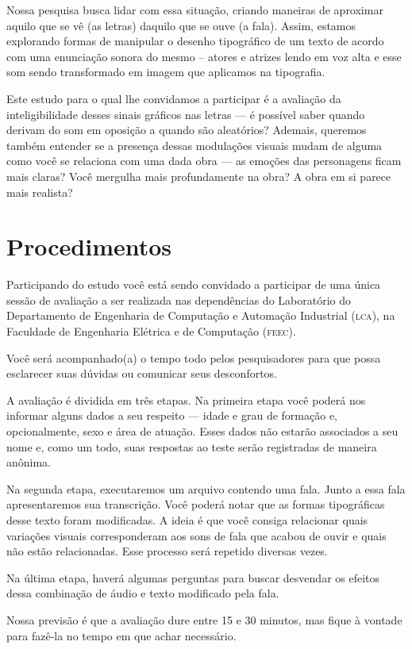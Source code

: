 \documentclass[a4paper,11pt,titlepage,singlespacing]{article}
\begin{document}
Nossa pesquisa busca lidar com essa situação, criando maneiras de aproximar aquilo que se vê (as letras) daquilo que se ouve (a fala). Assim, estamos explorando formas de manipular o desenho tipográfico de um texto de acordo com uma enunciação sonora do mesmo – atores e atrizes lendo em voz alta e esse som sendo transformado em imagem que aplicamos na tipografia.

Este estudo para o qual lhe convidamos a participar é a avaliação da inteligibilidade desses sinais gráficos nas letras — é possível saber quando derivam do som em oposição a quando são aleatórios? Ademais, queremos também entender se a presença dessas modulações visuais mudam de alguma como você se relaciona com uma dada obra — as emoções das personagens ficam mais claras? Você mergulha mais profundamente na obra? A obra em si parece mais realista?

\section*{Procedimentos}

\noindent Participando do estudo você está sendo convidado a participar de uma única sessão de avaliação a ser realizada nas dependências do Laboratório do Departamento de Engenharia de Computação e Automação Industrial (\textsc{lca}), na Faculdade de Engenharia Elétrica e de Computação (\textsc{feec}).

Você será acompanhado(a) o tempo todo pelos pesquisadores para que possa esclarecer suas dúvidas ou comunicar seus desconfortos.

A avaliação é dividida em três etapas. Na primeira etapa você poderá nos informar alguns dados a seu respeito — idade e grau de formação e, opcionalmente, sexo e área de atuação. Esses dados não estarão associados a seu nome e, como um todo, suas respostas ao teste serão registradas de maneira anônima.

Na segunda etapa, executaremos um arquivo contendo uma fala. Junto a essa fala apresentaremos sua transcrição. Você poderá notar que as formas tipográficas desse texto foram modificadas. A ideia é que você consiga relacionar quais variações visuais corresponderam aos sons de fala que acabou de ouvir e quais não estão relacionadas. Esse processo será repetido diversas vezes.

Na última etapa, haverá algumas perguntas para buscar desvendar os efeitos dessa combinação de áudio e texto modificado pela fala.

Nossa previsão é que a avaliação dure entre 15 e 30 minutos, mas fique à vontade para fazê-la no tempo em que achar necessário.
\end{document}

